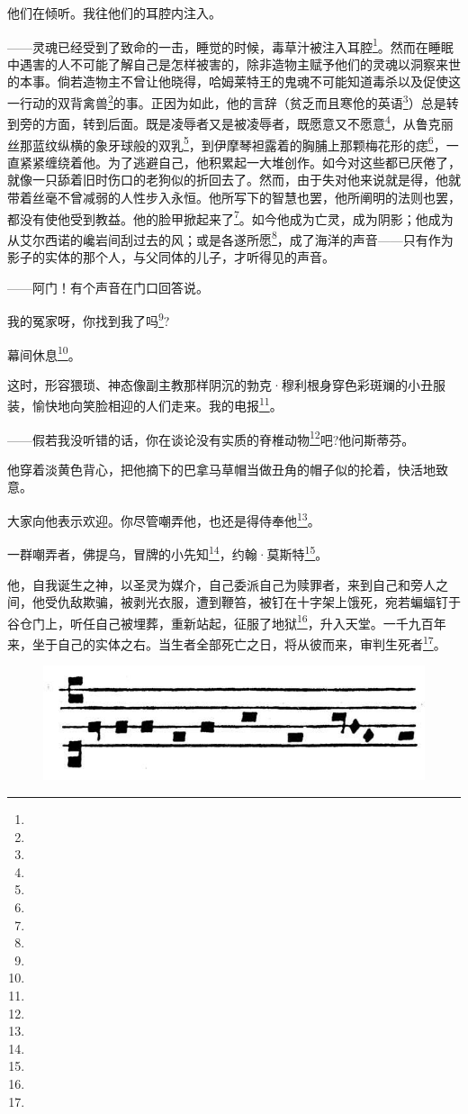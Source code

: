 \par 他们在倾听。我往他们的耳腔内注入。
\par ——灵魂已经受到了致命的一击，睡觉的时候，毒草汁被注入耳腔\footnote{}。然而在睡眠中遇害的人不可能了解自己是怎样被害的，除非造物主赋予他们的灵魂以洞察来世的本事。倘若造物主不曾让他晓得，哈姆莱特王的鬼魂不可能知道毒杀以及促使这一行动的双背禽兽\footnote{}的事。正因为如此，他的言辞（贫乏而且寒伧的英语\footnote{}）总是转到旁的方面，转到后面。既是凌辱者又是被凌辱者，既愿意又不愿意\footnote{}，从鲁克丽丝那蓝纹纵横的象牙球般的双乳\footnote{}，到伊摩琴袒露着的胸脯上那颗梅花形的痣\footnote{}，一直紧紧缠绕着他。为了逃避自己，他积累起一大堆创作。如今对这些都已厌倦了，就像一只舔着旧时伤口的老狗似的折回去了。然而，由于失对他来说就是得，他就带着丝毫不曾减弱的人性步入永恒。他所写下的智慧也罢，他所阐明的法则也罢，都没有使他受到教益。他的脸甲掀起来了\footnote{}。如今他成为亡灵，成为阴影；他成为从艾尔西诺的巉岩间刮过去的风；或是各遂所愿\footnote{}，成了海洋的声音——只有作为影子的实体的那个人，与父同体的儿子，才听得见的声音。
\par ——阿门！有个声音在门口回答说。
\par 我的冤家呀，你找到我了吗\footnote{}?
\par 幕间休息\footnote{}。
\par 这时，形容猥琐、神态像副主教那样阴沉的勃克·穆利根身穿色彩斑斓的小丑服装，愉快地向笑脸相迎的人们走来。我的电报\footnote{}。
\par ——假若我没听错的话，你在谈论没有实质的脊椎动物\footnote{}吧?他问斯蒂芬。
\par 他穿着淡黄色背心，把他摘下的巴拿马草帽当做丑角的帽子似的抡着，快活地致意。
\par 大家向他表示欢迎。你尽管嘲弄他，也还是得侍奉他\footnote{}。
\par 一群嘲弄者，佛提乌，冒牌的小先知\footnote{}，约翰·莫斯特\footnote{}。
\par 他，自我诞生之神，以圣灵为媒介，自己委派自己为赎罪者，来到自己和旁人之间，他受仇敌欺骗，被剥光衣服，遭到鞭笞，被钉在十字架上饿死，宛若蝙蝠钉于谷仓门上，听任自己被埋葬，重新站起，征服了地狱\footnote{}，升入天堂。一千九百年来，坐于自己的实体之右。当生者全部死亡之日，将从彼而来，审判生死者\footnote{}。
\begin{figure}[htb]
    \includegraphics[scale=0.3]{picture/尤利西斯1.jpeg}
\end{figure}
